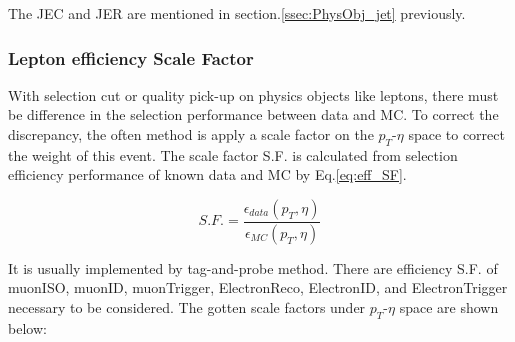			The JEC and JER are mentioned in section.\ref{ssec:PhysObj_jet} previously.

		\subsubsection{Lepton efficiency Scale Factor}
		\label{sssec:DataAndMC_LepEffSF}

		With selection cut or quality pick-up on physics objects like leptons, there must be difference in the selection performance between data and MC. To correct the discrepancy, the often method is apply a scale factor on the $p_T$-$\eta$ space to correct the weight of this event. The scale factor S.F. is calculated from selection efficiency performance of known data and MC by Eq.\ref{eq:eff_SF}. 

		\begin{equation}
		S.F. = \frac{\epsilon_{data}(p_T,\eta)}{\epsilon_{MC}(p_T,\eta)}
		\label{eq:eff_SF}
		\end{equation}

		It is usually implemented by tag-and-probe method\cite{tagandprobe_twiki}. There are efficiency S.F. of muonISO, muonID, muonTrigger, ElectronReco, ElectronID, and ElectronTrigger necessary to be considered. The gotten scale factors under $p_T$-$\eta$ space are shown below:

